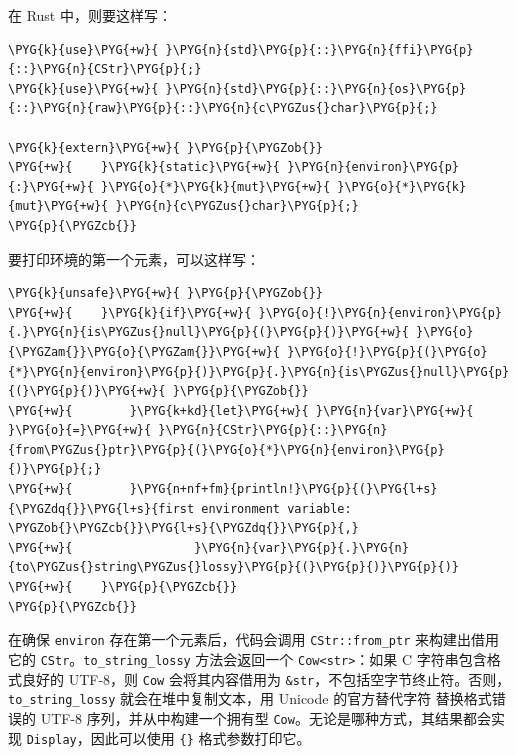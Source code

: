 在 Rust 中，则要这样写：

\begin{Verbatim}[commandchars=\\\{\},breaklines=true,breakanywhere=true,fontsize=\codefont,xleftmargin=17bp]
\PYG{k}{use}\PYG{+w}{ }\PYG{n}{std}\PYG{p}{::}\PYG{n}{ffi}\PYG{p}{::}\PYG{n}{CStr}\PYG{p}{;}
\PYG{k}{use}\PYG{+w}{ }\PYG{n}{std}\PYG{p}{::}\PYG{n}{os}\PYG{p}{::}\PYG{n}{raw}\PYG{p}{::}\PYG{n}{c\PYGZus{}char}\PYG{p}{;}

\PYG{k}{extern}\PYG{+w}{ }\PYG{p}{\PYGZob{}}
\PYG{+w}{    }\PYG{k}{static}\PYG{+w}{ }\PYG{n}{environ}\PYG{p}{:}\PYG{+w}{ }\PYG{o}{*}\PYG{k}{mut}\PYG{+w}{ }\PYG{o}{*}\PYG{k}{mut}\PYG{+w}{ }\PYG{n}{c\PYGZus{}char}\PYG{p}{;}
\PYG{p}{\PYGZcb{}}
\end{Verbatim}

要打印环境的第一个元素，可以这样写：

\begin{Verbatim}[commandchars=\\\{\},breaklines=true,breakanywhere=true,fontsize=\codefont,xleftmargin=17bp]
\PYG{k}{unsafe}\PYG{+w}{ }\PYG{p}{\PYGZob{}}
\PYG{+w}{    }\PYG{k}{if}\PYG{+w}{ }\PYG{o}{!}\PYG{n}{environ}\PYG{p}{.}\PYG{n}{is\PYGZus{}null}\PYG{p}{(}\PYG{p}{)}\PYG{+w}{ }\PYG{o}{\PYGZam{}}\PYG{o}{\PYGZam{}}\PYG{+w}{ }\PYG{o}{!}\PYG{p}{(}\PYG{o}{*}\PYG{n}{environ}\PYG{p}{)}\PYG{p}{.}\PYG{n}{is\PYGZus{}null}\PYG{p}{(}\PYG{p}{)}\PYG{+w}{ }\PYG{p}{\PYGZob{}}
\PYG{+w}{        }\PYG{k+kd}{let}\PYG{+w}{ }\PYG{n}{var}\PYG{+w}{ }\PYG{o}{=}\PYG{+w}{ }\PYG{n}{CStr}\PYG{p}{::}\PYG{n}{from\PYGZus{}ptr}\PYG{p}{(}\PYG{o}{*}\PYG{n}{environ}\PYG{p}{)}\PYG{p}{;}
\PYG{+w}{        }\PYG{n+nf+fm}{println!}\PYG{p}{(}\PYG{l+s}{\PYGZdq{}}\PYG{l+s}{first environment variable: \PYGZob{}\PYGZcb{}}\PYG{l+s}{\PYGZdq{}}\PYG{p}{,}
\PYG{+w}{                 }\PYG{n}{var}\PYG{p}{.}\PYG{n}{to\PYGZus{}string\PYGZus{}lossy}\PYG{p}{(}\PYG{p}{)}\PYG{p}{)}
\PYG{+w}{    }\PYG{p}{\PYGZcb{}}
\PYG{p}{\PYGZcb{}}
\end{Verbatim}

在确保 \texttt{environ} 存在第一个元素后，代码会调用 \texttt{CStr::from\_ptr} 来构建出借用它的 \texttt{CStr}。\texttt{to\_string\_lossy} 方法会返回一个 \texttt{Cow<str>}：如果 C 字符串包含格式良好的 UTF-8，则 \texttt{Cow} 会将其内容借用为 \texttt{\&str}，不包括空字节终止符。否则，\texttt{to\_string\_lossy} 就会在堆中复制文本，用 Unicode 的官方替代字符  替换格式错误的 UTF-8 序列，并从中构建一个拥有型 \texttt{Cow}。无论是哪种方式，其结果都会实现 \texttt{Display}，因此可以使用 \texttt{\{\}} 格式参数打印它。

